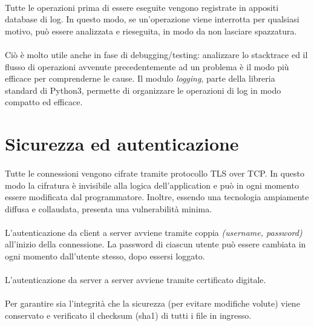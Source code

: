 \documentclass{article}
\begin{document}
\paragraph{} Tutte le operazioni prima di essere eseguite vengono registrate in appositi database di log. In questo modo, se un'operazione viene interrotta per qualsiasi motivo, può essere analizzata e rieseguita, in modo da non lasciare spazzatura. 

\paragraph{} Ciò è molto utile anche in fase di debugging/testing: analizzare lo stacktrace ed il flusso di operazioni avvenute precedentemente ad un problema è il modo più efficace per comprenderne le cause. Il modulo \emph{logging}, parte della libreria standard di Python3, permette di organizzare le operazioni di log in modo compatto ed efficace. 


\section{Sicurezza ed autenticazione}

\paragraph{} Tutte le connessioni vengono cifrate tramite protocollo TLS over TCP. In questo modo la cifratura è invisibile alla logica dell'application e può in ogni momento essere modificata dal programmatore. Inoltre, essendo una tecnologia ampiamente diffusa e collaudata, presenta una vulnerabilità minima. 

\paragraph{} L'autenticazione da client a server avviene tramite coppia \emph{(username, password)} all'inizio della connessione. La password di ciascun utente può essere cambiata in ogni momento dall'utente stesso, dopo essersi loggato. 

\paragraph{} L'autenticazione da server a server avviene tramite certificato digitale.

\paragraph{} Per garantire sia l'integrità che la sicurezza (per evitare modifiche volute) viene conservato e verificato il checksum (sha1) di tutti i file in ingresso. 
\end{document}
